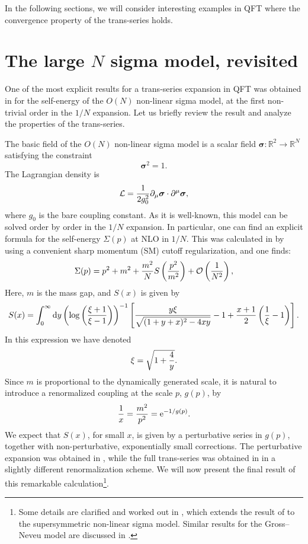 \documentclass[a4paper,11pt]{article}
\theoremstyle{definition}
\newcommand{\CL}{{\cal L}}
\newcommand{\CO}{{\cal O}}
\def\IR{{\mathbb R}}
\newcommand{\re}{{\rm e}}
\newcommand{\rd}{{\rm d}}
\newcommand{\be}{\begin{equation}}
\newcommand{\ee}{\end{equation}}
\newcommand{\sectiono}[1]{\section{#1}\setcounter{equation}{0}}
\begin{document}
In the following sections, we will consider interesting examples in QFT where the convergence property of the trans-series 
holds. 


   



\sectiono{The large \texorpdfstring{$N$}{N} sigma model, revisited} 
\label{sec-sigma}



One of the most explicit results for a trans-series expansion in QFT was obtained in \cite{beneke-braun} for the 
self-energy of the $O(N)$ non-linear sigma model, at the first non-trivial order in the $1/N$ expansion. Let us briefly review 
the result and analyze the properties of the trans-series. 

The basic field of the $O(N)$ non-linear sigma model is a scalar 
field $\boldsymbol{\sigma}: \IR^2 \rightarrow \IR^N$ satisfying the constraint
%
\be
\boldsymbol{\sigma}^2=1. 
\ee
%
The Lagrangian density is 
%
\be
\CL={1\over 2 g_0^2}  \partial_\mu \boldsymbol{\sigma} \cdot  \partial^\mu {\boldsymbol{\sigma}}, 
\ee
%
where $g_0$ is the bare coupling constant. As it is well-known, this model can be solved order by order in the $1/N$ expansion. 
In particular, one can find an explicit formula for the self-energy $\Sigma(p)$ at NLO in $1/N$. This was calculated in \cite{cr-dr} by using a convenient sharp momentum (SM) cutoff regularization, and one finds: 
%
\be
\Sigma(p)=p^2+ m^2 +{m^2 \over N} S\left( {p^2 \over m^2} \right) + \CO\left({1\over N^2} \right), 
\ee
%
Here, $m$ is the mass gap, and $S(x)$ is given by 
%
%
 \be
 \label{Sx}
 S(x)= \int_0^\infty \rd y \left(  \log\left( {\xi+ 1  \over \xi-1}  \right)\right)^{-1} \left[  {y  \xi \over {\sqrt{(1+ y +x)^2-4 x y}}} -1+
  {x+ 1 \over 2} \left( {1\over \xi}-1\right) \right]. 
  \ee
 In this expression we have denoted
 \be
 \xi ={\sqrt{1+ {4 \over y}}}. 
 \ee
Since $m$ is proportional to the dynamically generated scale, it is natural to introduce a renormalized 
coupling at the scale $p$, $g(p)$, by 
%
\be
{1\over x}={ m^2 \over p^2}= \re^{-1/g(p)}.
\ee
%
We expect that $S(x)$, for small $x$, is given by a perturbative series in $g(p)$, together 
with non-perturbative, exponentially small corrections. The perturbative expansion was obtained in 
\cite{cr-dr}, while the full trans-series was obtained in \cite{beneke-braun} 
in a slightly different renormalization scheme. We will now present the final result of this remarkable calculation\footnote{Some details are clarified and worked out in \cite{sss}, which extends the result of \cite{beneke-braun} to the supersymmetric non-linear sigma model. Similar results for the Gross--Neveu model are discussed in \cite{kneur}.}. 
\end{document}
